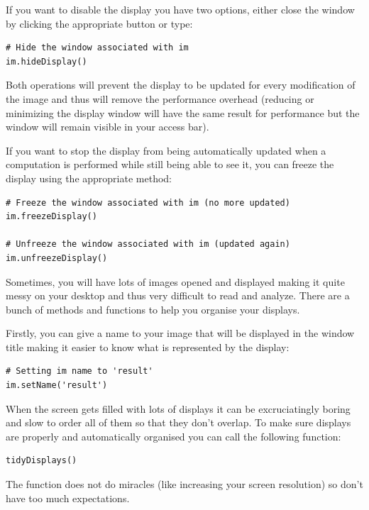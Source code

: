 \documentclass[a4paper,10pt,oneside]{article}
\begin{document}
If you want to disable the display you have two options, either close the window
by clicking the appropriate button or type:

\lstset{language=Python}
\begin{lstlisting}
# Hide the window associated with im
im.hideDisplay()
\end{lstlisting}

Both operations will prevent the display to be updated for every modification of
the image and thus will remove the performance overhead (reducing or minimizing 
the display window will have the same result for performance but the window will
remain visible in your access bar).

If you want to stop the display from being automatically updated when a 
computation is performed while still being able to see it, you can freeze the 
display using the appropriate method:

\lstset{language=Python}
\begin{lstlisting}
# Freeze the window associated with im (no more updated)
im.freezeDisplay()

# Unfreeze the window associated with im (updated again)
im.unfreezeDisplay()
\end{lstlisting}

Sometimes, you will have lots of images opened and displayed making it quite
messy on your desktop and thus very difficult to read and analyze. There are a
bunch of methods and functions to help you organise your displays.

Firstly, you can give a name to your image that will be displayed in the window
title making it easier to know what is represented by the display:

\lstset{language=Python}
\begin{lstlisting}
# Setting im name to 'result'
im.setName('result')
\end{lstlisting}

When the screen gets filled with lots of displays it can be excruciatingly
boring and slow to order all of them so that they don't overlap. To make sure 
displays are properly and automatically organised you can call the following 
function:

\lstset{language=Python}
\begin{lstlisting}
tidyDisplays()
\end{lstlisting}

The function does not do miracles (like increasing your screen resolution) so
don't have too much expectations.
\end{document}
